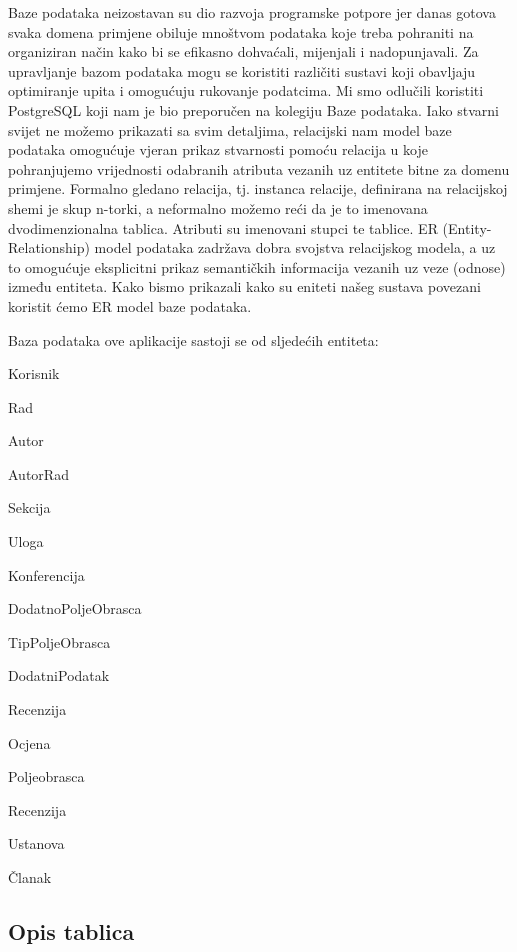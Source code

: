 			

		Baze podataka neizostavan su dio razvoja programske potpore jer danas gotova svaka domena primjene obiluje mnoštvom podataka koje treba pohraniti na organiziran način kako bi se efikasno dohvaćali, mijenjali i nadopunjavali. Za upravljanje bazom podataka mogu se koristiti različiti sustavi koji obavljaju optimiranje upita i omogućuju rukovanje podatcima. Mi smo odlučili koristiti PostgreSQL koji nam je bio preporučen na kolegiju Baze podataka. \newline Iako stvarni svijet ne možemo prikazati sa svim detaljima, relacijski nam model baze podataka omogućuje vjeran prikaz stvarnosti pomoću relacija u koje pohranjujemo vrijednosti odabranih atributa vezanih uz entitete bitne za domenu primjene. Formalno gledano relacija, tj. instanca relacije, definirana na relacijskoj shemi je skup n-torki, a neformalno možemo reći da je to imenovana dvodimenzionalna tablica. Atributi su imenovani stupci te tablice. ER (Entity-Relationship) model podataka zadržava dobra svojstva relacijskog modela, a uz to omogućuje eksplicitni prikaz semantičkih informacija vezanih uz veze (odnose) između entiteta. Kako bismo prikazali kako su eniteti našeg sustava povezani koristit ćemo ER model baze podataka.

		Baza podataka ove aplikacije sastoji se od sljedećih entiteta:
		\begin{packed_item}
			\item Korisnik
			\item Rad
			\item Autor
			\item AutorRad
			\item Sekcija
			\item Uloga
			\item Konferencija
			\item DodatnoPoljeObrasca
			\item TipPoljeObrasca
			\item DodatniPodatak 
			\item Recenzija
			\item Ocjena
			\item Poljeobrasca
			\item Recenzija
			\item Ustanova
			\item Članak
		\end{packed_item}
		
			\subsection{Opis tablica}
			
